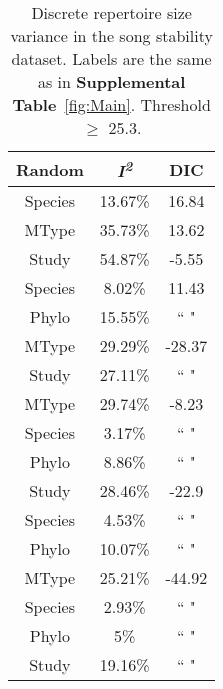 \documentclass{article}
\begin{document}
  \begin{table}[H]
  \centering
  \caption{Discrete repertoire size variance in the song stability dataset. Labels are the same as in \textbf{Supplemental Table}~\ref{fig:Main}. Threshold $\ge$ 25.3.} 
  \begin{tabular}{ccc}
  \hline
  Random & \textit{I\textsuperscript{2}} & DIC \\ 
  \hline
  Species & 13.67\% & 16.84 \\ \hdashline
  MType & 35.73\% & 13.62 \\ \hdashline
  Study & 54.87\% & -5.55 \\ \hdashline
  Species & 8.02\% & 11.43 \\ 
  Phylo & 15.55\% & `` " \\ \hdashline
  MType & 29.29\% & -28.37 \\ 
  Study & 27.11\% & `` " \\ \hdashline
  MType & 29.74\% & -8.23 \\ 
  Species & 3.17\% & `` " \\ 
  Phylo & 8.86\% & `` " \\ \hdashline
  Study & 28.46\% & -22.9 \\ 
  Species & 4.53\% & `` " \\ 
  Phylo & 10.07\% & `` " \\ \hdashline
  MType & 25.21\% & -44.92 \\ 
  Species & 2.93\% & `` " \\ 
  Phylo & 5\% & `` " \\ 
  Study & 19.16\% & `` " \\ 
  \hline
  \end{tabular}
  \end{table}
\end{document}
